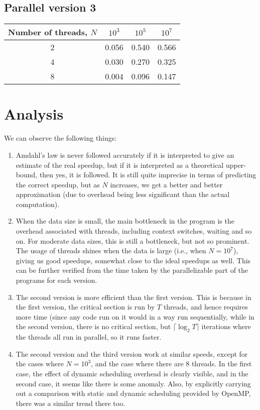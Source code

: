 \documentclass[a4paper]{article}
\begin{document}
\subsection{Parallel version 3}

\begin{center}
    \begin{tabular}{|c|c|c|c|}
        \hline
        Number of threads, $N$ & $10^3$ & $10^5$ & $10^7$ \\
        \hline
        2 & 0.056 & 0.540 & 0.566 \\
        \hline
        4 & 0.030 & 0.270 & 0.325 \\
        \hline
        8 & 0.004 & 0.096 & 0.147 \\
        \hline
    \end{tabular}
\end{center}


\section{Analysis}

We can observe the following things:

\begin{enumerate}
    \item Amdahl's law is never followed accurately if it is interpreted to give an estimate of the real speedup, but if it is interpreted as a theoretical upper-bound, then yes, it is followed.
        It is still quite imprecise in terms of predicting the correct speedup, but as $N$ increases, we get a better and better approximation (due to overhead being less significant than the
        actual computation).
    \item When the data size is small, the main bottleneck in the program is the overhead associated with threads, including context switches, waiting and so on. For moderate data sizes,
        this is still a bottleneck, but not so prominent. The usage of threads shines when the data is large (i.e., when $N = 10^7$), giving us good speedups, somewhat close to the ideal speedups
        as well. This can be further verified from the time taken by the parallelizable part of the programs for each version.
    \item The second version is more efficient than the first version. This is because in the first version, the critical section is run by $T$ threads, and hence requires more time (since any code
        run on it would in a way run sequentially, while in the second version, there is no critical section, but $\lceil \log_2 T \rceil$ iterations where the threads all run in parallel,
        so it runs faster.
    \item The second version and the third version work at similar speeds, except for the cases where $N = 10^3$, and the case where there are 8 threads. In the first case, the effect of dynamic
        scheduling overhead is clearly visible, and in the second case, it seems like there is some anomaly. Also, by explicitly carrying out a
        comparison with static and dynamic scheduling provided by OpenMP, there was a similar trend there too.
\end{enumerate}
\end{document}
